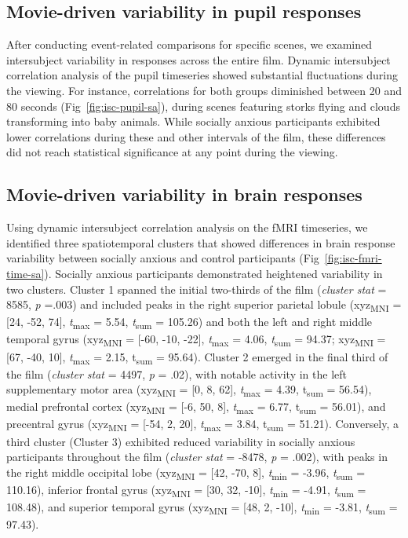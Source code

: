 \subsection{Movie-driven variability in pupil responses}
After conducting event-related comparisons for specific scenes, we examined intersubject variability in responses across the entire film. Dynamic intersubject correlation analysis of the pupil timeseries showed substantial fluctuations during the viewing. For instance, correlations for both groups diminished between 20 and 80 seconds (Fig~\ref{fig:isc-pupil-sa}), during scenes featuring storks flying and clouds transforming into baby animals. While socially anxious participants exhibited lower correlations during these and other intervals of the film, these differences did not reach statistical significance at any point during the viewing.

\subsection{Movie-driven variability in brain responses}
Using dynamic intersubject correlation analysis on the fMRI timeseries, we identified three spatiotemporal clusters that showed differences in brain response variability between socially anxious and control participants (Fig~\ref{fig:isc-fmri-time-sa}). Socially anxious participants demonstrated heightened variability in two clusters. Cluster 1 spanned the initial two-thirds of the film (\textit{cluster stat} = 8585, \textit{p} =.003) and included peaks in the right superior parietal lobule (xyz\textsubscript{MNI} = [24, -52, 74], \textit{t}\textsubscript{max} = 5.54, \textit{t}\textsubscript{sum} = 105.26) and both the left and right middle temporal gyrus (xyz\textsubscript{MNI} = [-60, -10, -22], \textit{t}\textsubscript{max} = 4.06, \textit{t}\textsubscript{sum} = 94.37; xyz\textsubscript{MNI} = [67, -40, 10], \textit{t}\textsubscript{max} = 2.15, t\textsubscript{sum} = 95.64). Cluster 2 emerged in the final third of the film (\textit{cluster stat} = 4497, \textit{p} = .02), with notable activity in the left supplementary motor area (xyz\textsubscript{MNI} = [0, 8, 62], \textit{t}\textsubscript{max} = 4.39, t\textsubscript{sum} = 56.54), medial prefrontal cortex (xyz\textsubscript{MNI} = [-6, 50, 8], \textit{t}\textsubscript{max} = 6.77, t\textsubscript{sum} = 56.01), and precentral gyrus (xyz\textsubscript{MNI} = [-54, 2, 20], \textit{t}\textsubscript{max} = 3.84, t\textsubscript{sum} = 51.21). Conversely, a third cluster (Cluster 3) exhibited reduced variability in socially anxious participants throughout the film (\textit{cluster stat} = -8478, \textit{p} = .002), with peaks in the right middle occipital lobe (xyz\textsubscript{MNI} = [42, -70, 8], \textit{t}\textsubscript{min} = -3.96, \textit{t}\textsubscript{sum} = 110.16), inferior frontal gyrus (xyz\textsubscript{MNI} = [30, 32, -10], \textit{t}\textsubscript{min} = -4.91, \textit{t}\textsubscript{sum} = 108.48), and superior temporal gyrus (xyz\textsubscript{MNI} = [48, 2, -10], \textit{t}\textsubscript{min} = -3.81, \textit{t}\textsubscript{sum} = 97.43). 

